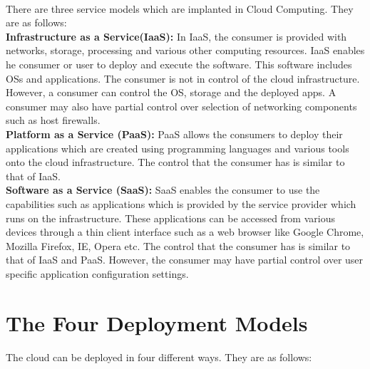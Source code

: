 \paragraph{\hspace{24pt}}
There are three service models which are implanted in Cloud Computing. They are as follows:\\
\textbf{Infrastructure as a Service(IaaS):} {In IaaS, the consumer is provided with networks, storage, processing and various other computing resources. IaaS enables he consumer or user to deploy and execute the software. This software includes OSs and applications. The consumer is not in control of the cloud infrastructure. However, a consumer can control the OS, storage and the deployed apps. A consumer may also have partial control over selection of networking components such as host firewalls.}\\
\textbf{Platform as a Service (PaaS):} {PaaS allows the consumers to deploy their applications which are created using programming languages and various tools onto the cloud infrastructure. The control that the consumer has is similar to that of IaaS.}\\
\textbf{Software as a Service (SaaS):} {SaaS enables the consumer to use the capabilities such as applications which is provided by the service provider which runs on the infrastructure. These applications can be accessed from various devices through a thin client interface such as a web browser like Google Chrome, Mozilla Firefox, IE, Opera etc. The control that the consumer has is similar to that of IaaS and PaaS. However, the consumer may have partial control over user specific application configuration settings.}

\section{The Four Deployment Models}
\paragraph{\hspace{24pt}}
The cloud can be deployed in four different ways. They are as follows:\\

